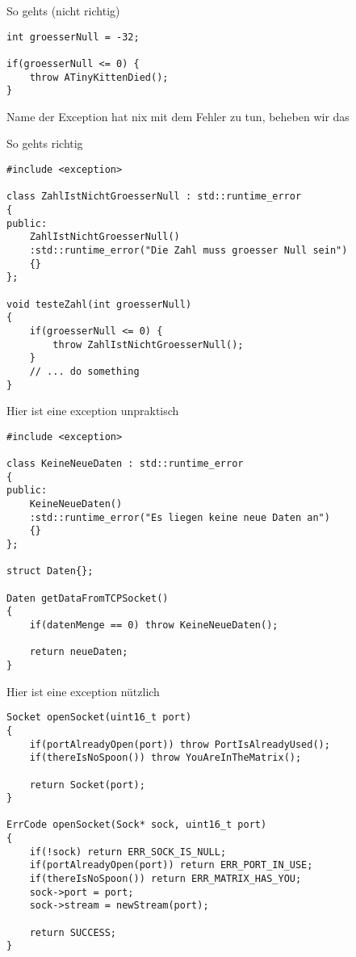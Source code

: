 \begin{frame}[fragile]{So gehts (nicht richtig)}
	\begin{lstlisting}[]
int groesserNull = -32;

if(groesserNull <= 0) {
    throw ATinyKittenDied();
}
	\end{lstlisting}

Name der Exception hat nix mit dem Fehler zu tun, beheben wir das

\end{frame}
\begin{frame}[fragile]{So gehts richtig}
	\begin{lstlisting}[]
#include <exception>

class ZahlIstNichtGroesserNull : std::runtime_error
{
public:
    ZahlIstNichtGroesserNull()
    :std::runtime_error("Die Zahl muss groesser Null sein")
    {}
};

void testeZahl(int groesserNull)
{
    if(groesserNull <= 0) {
        throw ZahlIstNichtGroesserNull();
    }
    // ... do something
}
	\end{lstlisting}

\end{frame}

\begin{frame}[fragile]{Hier ist eine exception unpraktisch}
	\begin{lstlisting}[]
#include <exception>

class KeineNeueDaten : std::runtime_error
{
public:
    KeineNeueDaten()
    :std::runtime_error("Es liegen keine neue Daten an")
    {}
};

struct Daten{};

Daten getDataFromTCPSocket()
{
    if(datenMenge == 0) throw KeineNeueDaten();
    
    return neueDaten;
}
	\end{lstlisting}

\end{frame}

\begin{frame}[fragile]{Hier ist eine exception nützlich}
	\begin{lstlisting}[]
Socket openSocket(uint16_t port)
{
    if(portAlreadyOpen(port)) throw PortIsAlreadyUsed();
    if(thereIsNoSpoon()) throw YouAreInTheMatrix();
    
    return Socket(port);
}

ErrCode openSocket(Sock* sock, uint16_t port)
{
    if(!sock) return ERR_SOCK_IS_NULL;
    if(portAlreadyOpen(port)) return ERR_PORT_IN_USE;
    if(thereIsNoSpoon()) return ERR_MATRIX_HAS_YOU;
    sock->port = port;
    sock->stream = newStream(port);

    return SUCCESS;
}
	\end{lstlisting}

\end{frame}


